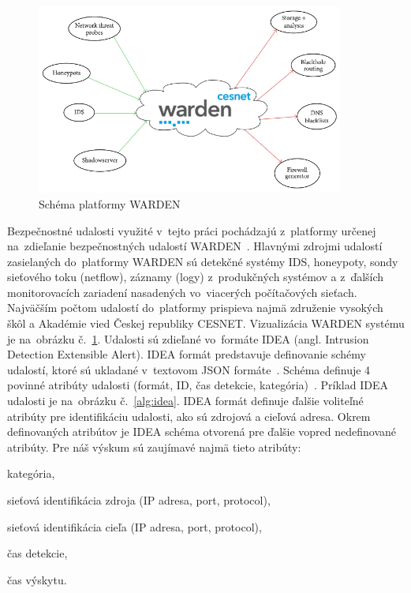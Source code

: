 \documentclass[thesismargins, thesislinespacing, openright, upjsfrontpage]{rnthesis}
\begin{document}
\begin{figure}[h]
  \centering
  \includegraphics[width=0.9\textwidth]{images/warden.png}
  \caption{Schéma platformy WARDEN~\cite{bajtovs2018network}}
  \label{fig:warden}
\end{figure}

Bezpečnostné udalosti využité v~tejto práci pochádzajú z~platformy určenej na~zdieľanie bezpečnostných udalostí WARDEN~\cite{kacha2015warden}. Hlavnými zdrojmi udalostí zasielaných do~platformy WARDEN sú detekčné systémy IDS, honeypoty, sondy sieťového toku (netflow), záznamy (logy) z~produkčných systémov a z~ďalších monitorovacích zariadení nasadených vo~viacerých počítačových sieťach. Najväčším poč\-tom udalostí do~platformy prispieva najmä združenie vysokých škôl a Akadémie vied Českej republiky CESNET. Vizualizácia WARDEN systému je na~obrázku č.~\ref{fig:warden}. Udalosti sú zdieľané vo~formáte IDEA (angl. Intrusion Detection Extensible Alert). IDEA formát predstavuje definovanie schémy udalostí, ktoré sú ukladané v~textovom JSON formáte~\cite{pezoa2016foundations}. Schéma definuje 4 povinné atribúty udalosti (formát, ID, čas detekcie, kategória)~\cite{kacha2014idea}. Príklad IDEA udalosti je na~obrázku č.~\ref{alg:idea}. IDEA formát definuje ďalšie voliteľné atribúty pre identifikáciu udalosti, ako sú zdrojová a cieľová adresa. Okrem definovaných atribútov je IDEA schéma otvorená pre ďalšie vopred nedefinované atribúty. Pre náš výskum sú zaujímavé najmä tieto atribúty:

\begin{compactenum}
\item kategória, 
\item sieťová identifikácia zdroja (IP adresa, port, protocol), 
\item sieťová identifikácia cieľa (IP adresa, port, protocol), 
\item čas detekcie,
\item čas výskytu.
\end{compactenum}
\end{document}
